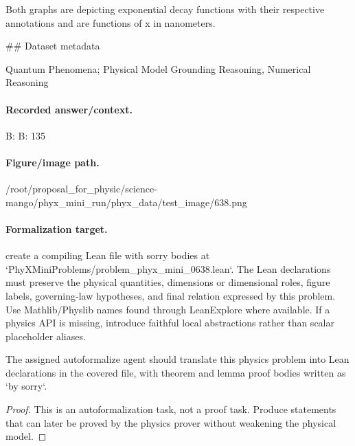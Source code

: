 Both graphs are depicting exponential decay functions with their respective annotations and are functions of x in nanometers.

\#\# Dataset metadata

Quantum Phenomena; Physical Model Grounding Reasoning, Numerical Reasoning

\paragraph{Recorded answer/context.}
B: B: 135

\paragraph{Figure/image path.}
/root/proposal\_for\_physic/science-mango/phyx\_mini\_run/phyx\_data/test\_image/638.png

\paragraph{Formalization target.}
create a compiling Lean file with sorry bodies at `PhyXMiniProblems/problem\_phyx\_mini\_0638.lean`. The Lean declarations must preserve the physical quantities, dimensions or dimensional roles, figure labels, governing-law hypotheses, and final relation expressed by this problem.
Use Mathlib/Physlib names found through LeanExplore where available. If a physics API is missing, introduce faithful local abstractions rather than scalar placeholder aliases.

\begin{theorem}
\label{thm:physics:phyx_mini_0638:target}
The assigned autoformalize agent should translate this physics problem into Lean declarations in the covered file, with theorem and lemma proof bodies written as `by sorry`.
\end{theorem}
\begin{proof}
This is an autoformalization task, not a proof task. Produce statements that can later be proved by the physics prover without weakening the physical model.
\end{proof}

